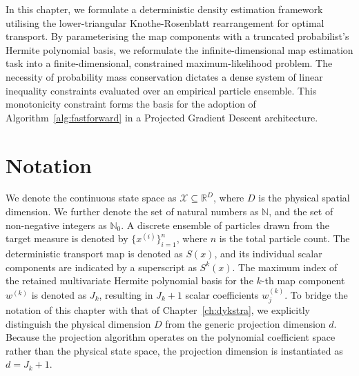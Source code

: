 In this chapter, we formulate a deterministic density estimation framework utilising the lower-triangular Knothe-Rosenblatt rearrangement for optimal transport. By parameterising the map components with a truncated probabilist's Hermite polynomial basis, we reformulate the infinite-dimensional map estimation task into a finite-dimensional, constrained maximum-likelihood problem. The necessity of probability mass conservation dictates a dense system of linear inequality constraints evaluated over an empirical particle ensemble. This monotonicity constraint forms the basis for the adoption of Algorithm~\ref{alg:fastforward} in a Projected Gradient Descent architecture.

\section*{Notation}
We denote the continuous state space as $\mathcal{X} \subseteq \mathbb{R}^D$, where $D$ is the physical spatial dimension. We further denote the set of natural numbers as $\mathbb{N}$, and the set of non-negative integers as $\mathbb{N}_0$. A discrete ensemble of particles drawn from the target measure is denoted by $\{x^{(i)}\}_{i=1}^n$, where $n$ is the total particle count. The deterministic transport map is denoted as $S(x)$, and its individual scalar components are indicated by a superscript as $S^k(x)$. The maximum index of the retained multivariate Hermite polynomial basis for the $k$-th map component $w^{(k)}$ is denoted as $J_k$, resulting in $J_k + 1$ scalar coefficients $w^{(k)}_j$. To bridge the notation of this chapter with that of Chapter~\ref{ch:dykstra}, we explicitly distinguish the physical dimension $D$ from the generic projection dimension $d$. Because the projection algorithm operates on the polynomial coefficient space rather than the physical state space, the projection dimension is instantiated as $d = J_k + 1$.